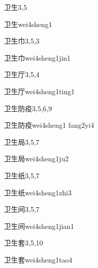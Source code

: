 \begin{entry}{卫生}{3,5}
  \begin{phonetics}{卫生}{wei4sheng1}
  \end{phonetics}
\end{entry}

\begin{entry}{卫生巾}{3,5,3}
  \begin{phonetics}{卫生巾}{wei4sheng1jin1}
  \end{phonetics}
\end{entry}

\begin{entry}{卫生厅}{3,5,4}
  \begin{phonetics}{卫生厅}{wei4sheng1ting1}
  \end{phonetics}
\end{entry}

\begin{entry}{卫生防疫}{3,5,6,9}
  \begin{phonetics}{卫生防疫}{wei4sheng1 fang2yi4}
  \end{phonetics}
\end{entry}

\begin{entry}{卫生局}{3,5,7}
  \begin{phonetics}{卫生局}{wei4sheng1ju2}
  \end{phonetics}
\end{entry}

\begin{entry}{卫生纸}{3,5,7}
  \begin{phonetics}{卫生纸}{wei4sheng1zhi3}
  \end{phonetics}
\end{entry}

\begin{entry}{卫生间}{3,5,7}
  \begin{phonetics}{卫生间}{wei4sheng1jian1}
  \end{phonetics}
\end{entry}

\begin{entry}{卫生套}{3,5,10}
  \begin{phonetics}{卫生套}{wei4sheng1tao4}
  \end{phonetics}
\end{entry}

